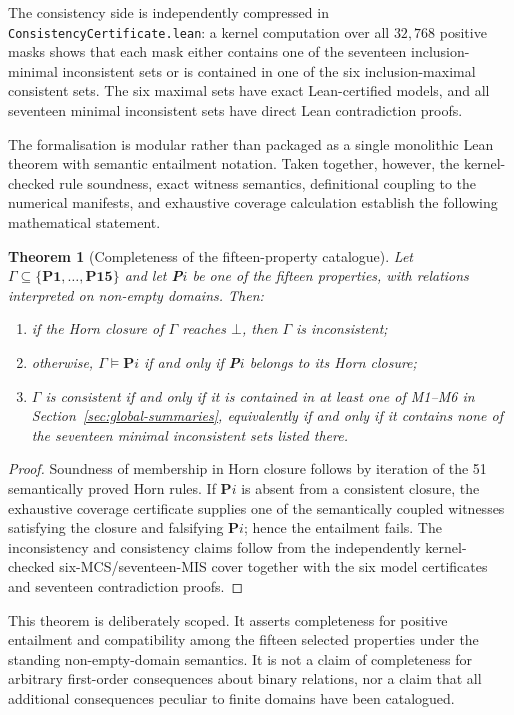 \documentclass[11pt,a4paper,reqno]{amsart}
\newtheorem{theorem}[proposition]{Theorem}
\theoremstyle{definition}
\theoremstyle{remark}
\newcommand{\prop}[1]{\textbf{P#1}}
\begin{document}
The consistency side is independently compressed in
\texttt{ConsistencyCertificate.lean}: a kernel computation over all
$32{,}768$ positive masks shows that each mask either contains one of the
seventeen inclusion-minimal inconsistent sets or is contained in one of the
six inclusion-maximal consistent sets.  The six maximal sets have exact
Lean-certified models, and all seventeen minimal inconsistent sets have direct
Lean contradiction proofs.

The formalisation is modular rather than packaged as a single monolithic Lean
theorem with semantic entailment notation.  Taken together, however, the
kernel-checked rule soundness, exact witness semantics, definitional coupling
to the numerical manifests, and exhaustive coverage calculation establish the
following mathematical statement.

\begin{theorem}[Completeness of the fifteen-property catalogue]
\label{thm:catalogue-complete}
Let $\Gamma\subseteq\{\prop{1},\ldots,\prop{15}\}$ and let \prop{$i$} be one
of the fifteen properties, with relations interpreted on non-empty domains.
Then:
\begin{enumerate}[label=(\roman*),noitemsep]
\item if the Horn closure of $\Gamma$ reaches $\bot$, then $\Gamma$ is
inconsistent;
\item otherwise, $\Gamma\models\prop{$i$}$ if and only if \prop{$i$} belongs
to its Horn closure;
\item $\Gamma$ is consistent if and only if it is contained in at least one of
M1--M6 in Section~\ref{sec:global-summaries}, equivalently if and only if it
contains none of the seventeen minimal inconsistent sets listed there.
\end{enumerate}
\end{theorem}

\begin{proof}
Soundness of membership in Horn closure follows by iteration of the 51
semantically proved Horn rules.  If \prop{$i$} is absent from a consistent
closure, the exhaustive coverage certificate supplies one of the semantically
coupled witnesses satisfying the closure and falsifying \prop{$i$}; hence the
entailment fails.  The inconsistency and consistency claims follow from the
independently kernel-checked six-MCS/seventeen-MIS cover together with the six
model certificates and seventeen contradiction proofs.
\end{proof}

This theorem is deliberately scoped.  It asserts completeness for positive
entailment and compatibility among the fifteen selected properties under the
standing non-empty-domain semantics.  It is not a claim of completeness for
arbitrary first-order consequences about binary relations, nor a claim that all
additional consequences peculiar to finite domains have been catalogued.
\end{document}
